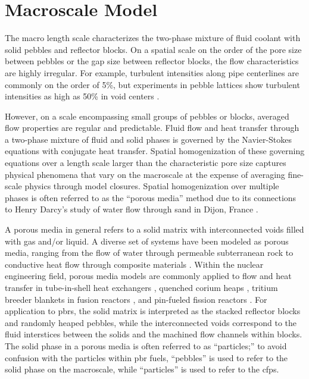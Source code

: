 \section{Macroscale Model}
\label{sec:macro_deriv}

The macro length scale characterizes the two-phase mixture of fluid coolant with solid pebbles and reflector blocks. On a spatial scale on the order of the pore size between pebbles or the gap size between reflector blocks, the flow characteristics are highly irregular. For example, turbulent intensities along pipe centerlines are commonly on the order of 5\%, but experiments in pebble lattices show turbulent intensities as high as 50\% in void centers \cite{mickley}. 

However, on a scale encompassing small groups of pebbles or blocks, averaged flow properties are regular and predictable. Fluid flow and heat transfer through a two-phase mixture of fluid and solid phases is governed by the Navier-Stokes equations with conjugate heat transfer. Spatial homogenization of these governing equations over a length scale larger than the characteristic pore size captures physical phenomena that vary on the macroscale at the expense of averaging fine-scale physics through model closures. Spatial homogenization over multiple phases is often referred to as the ``porous media'' method due to its connections to Henry Darcy's study of water flow through sand in Dijon, France \cite{darcy}.

A porous media in general refers to a solid matrix with interconnected voids filled with gas and/or liquid. A diverse set of systems have been modeled as porous media, ranging from the flow of water through permeable subterranean rock to conductive heat flow through composite materials \cite{diersch}. Within the nuclear engineering field, porous media models are commonly applied to flow and heat transfer in tube-in-shell heat exchangers \cite{ge_prhr}, quenched corium heaps \cite{magallon,raverdy}, tritium breeder blankets in fusion reactors \cite{xu_cfetr,zhang2016,guo2006}, and pin-fueled fission reactors \cite{zarifi}. For application to \glspl{pbr}, the solid matrix is interpreted as the stacked reflector blocks and randomly heaped pebbles, while the interconnected voids correspond to the fluid interstices between the solids and the machined flow channels within blocks. The solid phase in a porous media is often referred to as ``particles;'' to avoid confusion with the particles within \gls{pbr} fuels, ``pebbles'' is used to refer to the solid phase on the macroscale, while ``particles'' is used to refer to the \glspl{cfp}.

